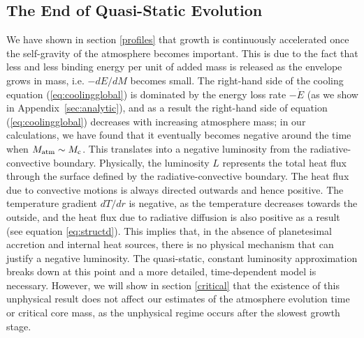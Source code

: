 \documentclass[apj]{emulateapj}
\newcommand{\App}[1]{Appendix~\ref{#1}}
\begin{document}
\subsection{The End of Quasi-Static Evolution}
\label{endoftime}

We have shown in section \ref{profiles} that growth is continuously accelerated once the self-gravity of the atmosphere becomes important. This is due to the fact that less and less binding energy per unit of added mass is released as the envelope grows in mass, i.e. $-dE/dM$ becomes small. The right-hand side of the cooling equation (\ref{eq:coolingglobal}) is dominated by the energy loss rate $-\dot{E}$ (as we show in \App{sec:analytic}), and as a result the right-hand side of equation (\ref{eq:coolingglobal}) decreases with increasing atmosphere mass; in our calculations, we have found that it eventually becomes negative around the time when $M_{\rm{atm}} \sim M_{\rm{c}}$. This translates into a negative luminosity from the radiative-convective boundary. Physically, the luminosity $L$ represents the total heat flux through the surface defined by the radiative-convective boundary. The heat flux due to convective motions is always directed outwards and hence positive. The temperature gradient $dT/dr$ is negative, as the temperature decreases towards the outside, and the heat flux due to radiative diffusion is also positive as a result (see equation \ref{eq:structd}). This implies that, in the absence of planetesimal accretion and internal heat sources, there is no physical mechanism that can justify a negative luminosity. The quasi-static, constant luminosity approximation breaks down at this point and a more detailed, time-dependent model is necessary. However, we will show in section \ref{critical} that the existence of this unphysical result does not affect our estimates of the atmosphere evolution time or critical core mass, as the unphysical regime occurs after the slowest growth stage. %



\end{document}
